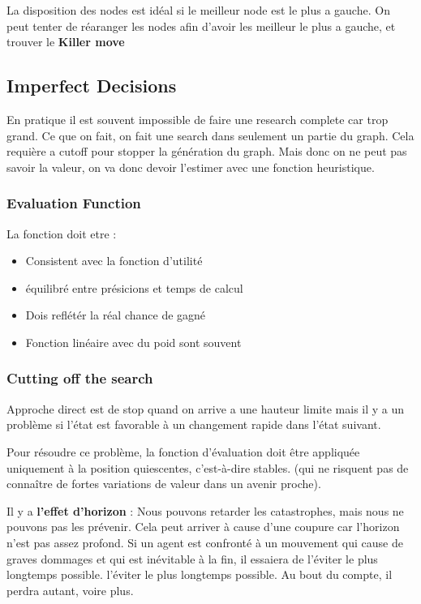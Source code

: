			La disposition des nodes est idéal si le meilleur node est le plus a gauche.
			On peut tenter de réaranger les nodes afin d'avoir les meilleur le plus a gauche, et trouver le \textbf{Killer move}
	\subsection{Imperfect Decisions}
		En pratique il est souvent impossible de faire une research complete car trop grand. Ce que on fait, on fait une search dans seulement un partie du graph. Cela requière a cutoff pour stopper la génération du graph. Mais donc on ne peut pas savoir la valeur, on va donc devoir l'estimer avec une fonction heuristique.
		
		\subsubsection{Evaluation Function}
			La fonction doit etre :
			\begin{itemize}
				\item Consistent avec la fonction d'utilité
				\item équilibré entre présicions et temps de calcul
				\item Dois reflétér la réal chance de gagné
				\item Fonction linéaire avec du poid sont souvent 
			\end{itemize}
			
		\subsubsection{Cutting off the search}
			Approche direct est de stop quand on arrive a une hauteur limite mais il y a un problème si l'état est favorable à un changement rapide dans l'état suivant.
			
			Pour résoudre ce problème, la fonction d'évaluation doit être appliquée uniquement à la position quiescentes, c'est-à-dire stables. (qui ne risquent pas de connaître de fortes variations de valeur dans un avenir proche).			
			
			Il y a \textbf{l'effet d'horizon} : Nous pouvons retarder les catastrophes, mais nous ne pouvons pas les prévenir. Cela peut arriver à cause d'une coupure car l'horizon n'est pas assez profond. Si un agent est confronté à un mouvement qui cause de graves dommages et qui est inévitable à la fin, il essaiera de l'éviter le plus longtemps possible. l'éviter le plus longtemps possible. Au bout du compte, il perdra autant, voire plus.
			
